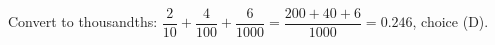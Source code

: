 Convert to thousandths: $\dfrac{2}{10}+\dfrac{4}{100}+\dfrac{6}{1000}=\dfrac{200+40+6}{1000}=\boxed{0.246}$, choice (D).
